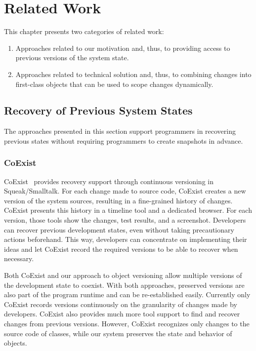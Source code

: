 \chapter{Related Work} \label{chapter:RELATED_WORK}

This chapter presents two categories of related work:

\begin{enumerate}
    \item Approaches related to our motivation and, thus, to providing access to previous versions of the system state.
    \item Approaches related to technical solution and, thus, to combining changes into first-class objects that can be used to scope changes dynamically.
\end{enumerate}


\section{Recovery of Previous System States}

The approaches presented in this section support programmers in recovering previous states without requiring programmers to create snapshots in advance.


\subsection{CoExist}

CoExist~\cite{Steinert2012COE} provides recovery support through continuous versioning in Squeak/Smalltalk.
For each change made to source code, CoExist creates a new version of the system sources, resulting in a fine-grained history of changes.
CoExist presents this history in a timeline tool and a dedicated browser.
For each version, those tools show the changes, test results, and a screenshot.
Developers can recover previous development states, even without taking precautionary actions beforehand.
This way, developers can concentrate on implementing their ideas and let CoExist record the required versions to be able to recover when necessary.

Both CoExist and our approach to object versioning allow multiple versions of the development state to coexist.
With both approaches, preserved versions are also part of the program runtime and can be re-established easily.
Currently only CoExist records versions continuously on the granularity of changes made by developers.
CoExist also provides much more tool support to find and recover changes from previous versions.
However, CoExist recognizes only changes to the source code of classes, while our system preserves the state and behavior of objects.



